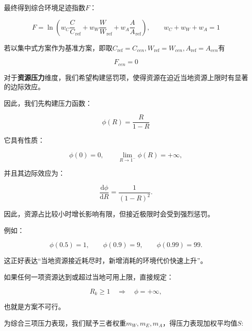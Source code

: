 最终得到综合环境足迹指数$F$：

\begin{equation}\label{eq:q2-findex}
F=\ln (w_C\frac{C}C_{\mathrm{ref}}+w_W\frac{W}W_{\mathrm{ref}}+w_A\frac{A}A_{\mathrm{ref}}), \qquad w_C+w_W+w_A=1
\end{equation}

若以集中式方案作为基准方案，即取$C_{\mathrm{ref}}=C_{cen},W_{\mathrm{ref}}=W_{cen},A_{\mathrm{ref}}=A_{cen}$有

\begin{equation}\label{eq:q2-fcen}
F_{cen}=0
\end{equation}


对于\textbf{资源压力}维度，我们希望构建惩罚项，使得资源在迫近当地资源上限时有显著的边际效应。

因此，我们先构建压力函数：

\begin{equation}\label{eq:q2-phi}
\phi(R)=\frac{R}{1-R}
\end{equation}

它具有性质：

\begin{equation}\label{eq:q2-phi-prop}
\phi(0)=0, \qquad \lim_{R\to1^-}\phi(R)=+\infty,
\end{equation}

并且其边际效应为：

\begin{equation}\label{eq:q2-phi-deriv}
\frac{\mathrm d\phi}{\mathrm dR} = \frac{1}{(1-R)^2}.
\end{equation}

因此，资源占比较小时增长影响有限，但接近极限时会受到强烈惩罚。

例如：

\begin{equation}\label{eq:q2-examples}
\phi(0.5)=1,\qquad \phi(0.9)=9,\qquad \phi(0.99)=99.
\end{equation}

这正好表达“当地资源接近耗尽时，新增消耗的环境代价快速上升”。

如果任何一项资源达到或超过当地可用上限，直接规定：

\begin{equation}\label{eq:q2-infeasible}
R_k\ge 1 \quad\Longrightarrow\quad \phi=+\infty,
\end{equation}

也就是方案不可行。

为综合三项压力表现，我们赋予三者权重$m_W,m_E,m_A$，得压力表现加权平均值$S$:

